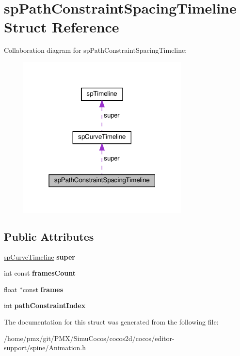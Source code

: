 \hypertarget{structspPathConstraintSpacingTimeline}{}\section{sp\+Path\+Constraint\+Spacing\+Timeline Struct Reference}
\label{structspPathConstraintSpacingTimeline}


Collaboration diagram for sp\+Path\+Constraint\+Spacing\+Timeline\+:
\nopagebreak
\begin{figure}[H]
\begin{center}
\leavevmode
\includegraphics[width=244pt]{structspPathConstraintSpacingTimeline__coll__graph}
\end{center}
\end{figure}
\subsection*{Public Attributes}
\begin{DoxyCompactItemize}
\item 
\mbox{\label{structspPathConstraintSpacingTimeline_a291bcaf6fd8cad88d5d4b6788a35d373}} 
\hyperlink{structspCurveTimeline}{sp\+Curve\+Timeline} {\bfseries super}
\item 
\mbox{\label{structspPathConstraintSpacingTimeline_ae6fe2dedf944d31044c6e18154df0824}} 
int const {\bfseries frames\+Count}
\item 
\mbox{\label{structspPathConstraintSpacingTimeline_aa283ab6e99ab219ba8bda608444f06e5}} 
float $\ast$const {\bfseries frames}
\item 
\mbox{\label{structspPathConstraintSpacingTimeline_a3763fb2405eed43e593ef0fa1f351b96}} 
int {\bfseries path\+Constraint\+Index}
\end{DoxyCompactItemize}


The documentation for this struct was generated from the following file\+:\begin{DoxyCompactItemize}
\item 
/home/pmx/git/\+P\+M\+X/\+Simu\+Cocos/cocos2d/cocos/editor-\/support/spine/Animation.\+h\end{DoxyCompactItemize}
